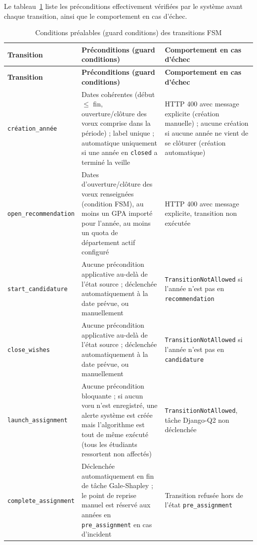 Le tableau~\ref{tab:fsm_guards} liste les préconditions effectivement vérifiées par le système avant chaque transition, ainsi que le comportement en cas d'échec.

\renewcommand{\arraystretch}{1.35}
\begingroup
\footnotesize
\begin{longtable}{|p{3.5cm}|p{5.5cm}|p{5.5cm}|}
\caption{Conditions préalables (guard conditions) des transitions FSM}
\label{tab:fsm_guards} \\
\hline
\rowcolor{gray!20}
\textbf{Transition} & \textbf{Préconditions (guard conditions)} & \textbf{Comportement en cas d'échec} \\
\hline
\endfirsthead
\hline
\rowcolor{gray!20}
\textbf{Transition} & \textbf{Préconditions (guard conditions)} & \textbf{Comportement en cas d'échec} \\
\hline
\endhead
\hline
\endfoot
\texttt{création\_année} & Dates cohérentes (début $\leq$ fin, ouverture/clôture des vœux comprise dans la période) ; label unique ; automatique uniquement si une année en \texttt{closed} a terminé la veille & HTTP 400 avec message explicite (création manuelle) ; aucune création si aucune année ne vient de se clôturer (création automatique) \\
\hline
\texttt{open\_recommendation} & Dates d'ouverture/clôture des vœux renseignées (condition FSM), au moins un GPA importé pour l'année, au moins un quota de département actif configuré & HTTP 400 avec message explicite, transition non exécutée \\
\hline
\texttt{start\_candidature} & Aucune précondition applicative au-delà de l'état source ; déclenchée automatiquement à la date prévue, ou manuellement & \texttt{TransitionNotAllowed} si l'année n'est pas en \texttt{recommendation} \\
\hline
\texttt{close\_wishes} & Aucune précondition applicative au-delà de l'état source ; déclenchée automatiquement à la date prévue, ou manuellement & \texttt{TransitionNotAllowed} si l'année n'est pas en \texttt{candidature} \\
\hline
\texttt{launch\_assignment} & Aucune précondition bloquante ; si aucun vœu n'est enregistré, une alerte système est créée mais l'algorithme est tout de même exécuté (tous les étudiants ressortent non affectés) & \texttt{TransitionNotAllowed}, tâche Django-Q2 non déclenchée \\
\hline
\texttt{complete\_assignment} & Déclenchée automatiquement en fin de tâche Gale-Shapley ; le point de reprise manuel est réservé aux années en \texttt{pre\_assignment} en cas d'incident & Transition refusée hors de l'état \texttt{pre\_assignment} \\

\end{longtable}
